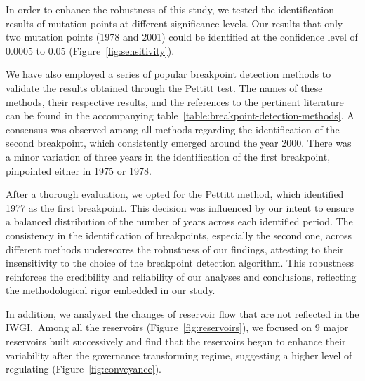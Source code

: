 In order to enhance the robustness of this study, we tested the identification results of mutation points at different significance levels.
Our results that only two mutation points (1978 and 2001) could be identified at the confidence level of $0.0005$ to $0.05$ (Figure~\ref{fig:sensitivity}).

We have also employed a series of popular breakpoint detection methods to validate the results obtained through the Pettitt test. The names of these methods, their respective results, and the references to the pertinent literature can be found in the accompanying table~\ref{table:breakpoint-detection-methods}. A consensus was observed among all methods regarding the identification of the second breakpoint, which consistently emerged around the year 2000. There was a minor variation of three years in the identification of the first breakpoint, pinpointed either in 1975 or 1978.

After a thorough evaluation, we opted for the Pettitt method, which identified 1977 as the first breakpoint. This decision was influenced by our intent to ensure a balanced distribution of the number of years across each identified period. The consistency in the identification of breakpoints, especially the second one, across different methods underscores the robustness of our findings, attesting to their insensitivity to the choice of the breakpoint detection algorithm. This robustness reinforces the credibility and reliability of our analyses and conclusions, reflecting the methodological rigor embedded in our study.



In addition, we analyzed the changes of reservoir flow that are not reflected in the IWGI.\ Among all the reservoirs (Figure~\ref{fig:reservoirs}), we focused on $9$ major reservoirs built successively and find that the reservoirs began to enhance their variability after the governance transforming regime, suggesting a higher level of regulating (Figure~\ref{fig:conveyance}).

